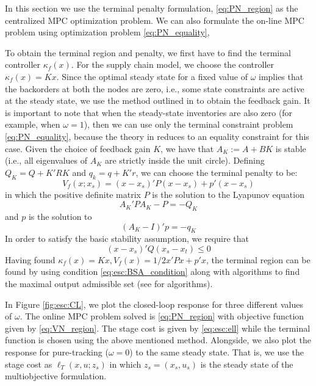 \documentclass{elsarticle}
\theoremstyle{definition}
\begin{document}
In this section we use the terminal
penalty formulation, \eqref{eq:PN_region} as the centralized MPC optimization problem.  We can also formulate the on-line MPC problem using optimization
problem \eqref{eq:PN_equality},

To obtain the terminal region and penalty, we first have to find the
terminal controller $\kappa_f(x)$. For the supply chain model, we
choose the controller $\kappa_f(x) = Kx$. Since the optimal steady
state for a fixed value of $\omega$ implies that the backorders at
both the nodes are zero, i.e., some state constraints are active at the steady state, we use the method outlined in
\cite{rao:rawlings:1999} to obtain the feedback gain. It is important
to note that when the steady-state inventories are also zero (for
example, when $\omega = 1$), then we can use only the terminal
constraint problem \eqref{eq:PN_equality}, because the theory
in \cite{rao:rawlings:1999} reduces to an equality constraint for this
case. Given the choice of
feedback gain $K$, we have that $A_K := A+BK$ is stable (i.e., all
eigenvalues of $A_K$ are strictly inside the unit circle). Defining
$Q_K = Q+K'RK$ and $q_k = q+K'r$, we can choose the terminal penalty
to be:
\begin{equation}
\label{eq:esc:Vf}
V_f(x;x_s) = (x-x_s)'P(x-x_s)+ p'(x-x_s)
\end{equation}
in which the positive definite matrix $P$ is the solution to the
Lyapunov equation
\[ A_K'PA_K-P = -Q_K \]
and $p$ is the solution to 
\[ (A_K-I)'p = -q_K \]
In order to satisfy the basic stability assumption, we require
that  
\begin{equation}
\label{eq:esc:BSA_condition}
(x-x_s)'Q(x_s-x_t)  \leq 0
\end{equation}
Having found $\kappa_f(x) = Kx, V_f(x) = 1/2x'Px + p'x$, the terminal
region can be found by using condition \eqref{eq:esc:BSA_condition}
along with algorithms to find the maximal output admissible set (see
\cite{gilbert:tan:1991, kvasnica:grieder:baotic:2006} for algorithms).

In Figure \ref{fig:esc:CL}, we plot the closed-loop response for three
different values of $\omega$. The online MPC problem solved is \eqref{eq:PN_region} with objective function given by \eqref{eq:VN_region}. The stage cost is given by \eqref{eq:esc:ell} while the terminal function is chosen using the above mentioned method.  Alongside, we also plot the response for
pure-tracking ($\omega = 0$) to the same steady state. That is,  we use the stage cost as $\ell_T(x,u;z_s)$ in which $z_s = (x_s,u_s)$ is the steady state of the multiobjective formulation. 
\end{document}
